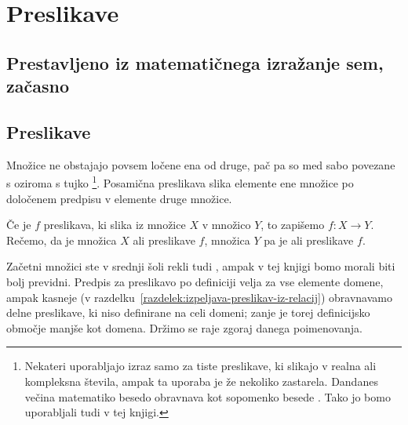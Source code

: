 \chapter{Preslikave}


\section{Prestavljeno iz matematičnega izražanje sem, začasno}
\label{sec:prest-iz-matem}



\section{Preslikave}

Množice ne obstajajo povsem ločene ena od druge, pač pa so med sabo povezane s  oziroma s tujko \footnote{Nekateri uporabljajo izraz  samo za tiste preslikave, ki slikajo v realna ali kompleksna števila, ampak ta uporaba je že nekoliko zastarela. Dandanes večina matematiko besedo  obravnava kot sopomenko besede . Tako jo bomo uporabljali tudi v tej knjigi.}. Posamična preslikava slika elemente ene množice po določenem predpisu v elemente druge množice.

Če je $f$ preslikava, ki slika iz množice $X$ v množico $Y$, to zapišemo $f\colon X \to Y$. Rečemo, da je množica $X$  ali  preslikave $f$, množica $Y$ pa je  ali  preslikave $f$.

Začetni množici ste v srednji šoli rekli tudi , ampak v tej knjigi bomo morali biti bolj previdni. Predpis za preslikavo po definiciji velja za vse elemente domene, ampak kasneje (v razdelku~\ref{razdelek:izpeljava-preslikav-iz-relacij}) obravnavamo delne preslikave, ki niso definirane na celi domeni; zanje je torej definicijsko območje manjše kot domena. Držimo se raje zgoraj danega poimenovanja.


